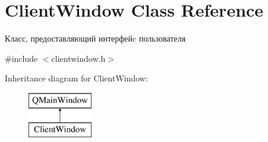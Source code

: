 \hypertarget{class_client_window}{}\section{Client\+Window Class Reference}
\label{class_client_window}


Класс, предоставляющий интерфейc пользователя  




{\ttfamily \#include $<$clientwindow.\+h$>$}

Inheritance diagram for Client\+Window\+:\begin{figure}[H]
\begin{center}
\leavevmode
\includegraphics[height=2.000000cm]{class_client_window}
\end{center}
\end{figure}
